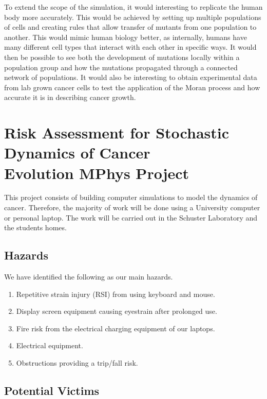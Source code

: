 \documentclass[12pt, a4paper,]{article}
\begin{document}
To extend the scope of the simulation, it would interesting to replicate the human body more accurately. This would be achieved by setting up multiple populations of cells and creating rules that allow transfer of mutants from one population to another. This would mimic human biology better, as internally, humans have many different cell types that interact with each other in specific ways. It would then be possible to see both the development of mutations locally within a population group and how the mutations propagated through a connected network of populations. 
It would also be interesting to obtain experimental data from lab grown cancer cells to test the application of the Moran process and how accurate it is in describing cancer growth. 

\newpage

\printbibliography

\newpage

\section*{Risk Assessment for Stochastic Dynamics of Cancer \\ Evolution MPhys Project}


This project consists of building computer simulations to model the dynamics of cancer. Therefore, the majority of work will be done using a University computer or personal laptop. The work will be carried out in the Schuster Laboratory and the students homes. 


\subsection*{Hazards}

We have identified the following as our main hazards. 

\begin{enumerate}
\item Repetitive strain injury (RSI) from using keyboard and mouse. 
\item Display screen equipment causing eyestrain after prolonged use.
\item Fire risk from the electrical charging equipment of our laptops. 
\item Electrical equipment. 
\item Obstructions providing a trip/fall risk.
\end{enumerate}

\subsection*{Potential Victims}
\end{document}
